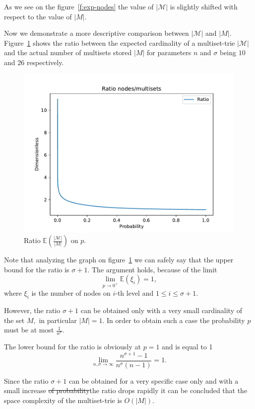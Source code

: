 \documentclass[10pt,letterpaper]{article}
\providecommand{\DIFaddtex}[1]{{\protect\color{blue}\uwave{#1}}} %
\providecommand{\DIFdeltex}[1]{{\protect\color{red}\sout{#1}}}                      %
\providecommand{\DIFaddbegin}{} %
\providecommand{\DIFaddend}{} %
\providecommand{\DIFdelbegin}{} %
\providecommand{\DIFdelend}{} %
\providecommand{\DIFadd}[1]{\texorpdfstring{\DIFaddtex{#1}}{#1}} %
\providecommand{\DIFdel}[1]{\texorpdfstring{\DIFdeltex{#1}}{}} %
\newcommand{\DIFscaledelfig}{0.5}
\newlength{\DIFdelgraphicswidth} %
\newlength{\DIFdelgraphicsheight} %
\newcommand{\DIFaddincludegraphics}[2][]{{\color{blue}\fbox{\DIFOincludegraphics[#1]{#2}}}} %
\newcommand{\DIFdelincludegraphics}[2][]{%
\sbox{\DIFdelgraphicsbox}{\DIFOincludegraphics[#1]{#2}}%
\settoboxwidth{\DIFdelgraphicswidth}{\DIFdelgraphicsbox} %
\settoboxtotalheight{\DIFdelgraphicsheight}{\DIFdelgraphicsbox} %
\scalebox{\DIFscaledelfig}{%
\parbox[b]{\DIFdelgraphicswidth}{\usebox{\DIFdelgraphicsbox}\\[-\baselineskip] \rule{\DIFdelgraphicswidth}{0em}}\llap{\resizebox{\DIFdelgraphicswidth}{\DIFdelgraphicsheight}{%
\setlength{\unitlength}{\DIFdelgraphicswidth}%
\begin{picture}(1,1)%
\thicklines\linethickness{2pt} %
{\color[rgb]{1,0,0}\put(0,0){\framebox(1,1){}}}%
{\color[rgb]{1,0,0}\put(0,0){\line( 1,1){1}}}%
{\color[rgb]{1,0,0}\put(0,1){\line(1,-1){1}}}%
\end{picture}%
}\hspace*{3pt}}} %
} %
\DeclareRobustCommand{\DIFaddbegin}{\DIFOaddbegin \let\includegraphics\DIFaddincludegraphics} %
\DeclareRobustCommand{\DIFaddend}{\DIFOaddend \let\includegraphics\DIFOincludegraphics} %
\DeclareRobustCommand{\DIFdelbegin}{\DIFOdelbegin \let\includegraphics\DIFdelincludegraphics} %
\DeclareRobustCommand{\DIFdelend}{\DIFOaddend \let\includegraphics\DIFOincludegraphics} %
\begin{document}
As we see on the figure~\ref{f:exp-nodes} the value of $|\mathcal{M}|$ is slightly 
shifted with respect to the value of $|M|.$

Now we demonstrate a more descriptive comparison between $|\mathcal{M}|$ and 
$|M|.$ Figure~\ref{f:ratio-exp-msets} shows the ratio between the expected cardinality 
of a multiset-trie $|\mathcal{M}|$ and the actual number of multisets stored $|M|$ for 
parameters $n$ and $\sigma$ being $10$ and $26$ respectively.

\begin{figure}[h!]
\center
\includegraphics[width=.4\textwidth, keepaspectratio]{ratio-exp-nodes-and-msets-on-prob.pdf}
\caption{Ratio $\mathbb{E}(\frac{|\mathcal{M}|}{|M|})$ on $p.$}
\label{f:ratio-exp-msets}
\end{figure}

Note that analyzing the graph on figure~\ref{f:ratio-exp-msets} we can safely 
say that the upper bound for the ratio is $\sigma + 1.$ The argument holds, 
because of the limit 
\begin{equation}
\lim_{p\rightarrow 0^+} \mathbb{E}(\xi_i) = 1,
\end{equation}
where $\xi_i$ is the number of nodes on $i$-th level and $1\leq i \leq \sigma + 1.$ 

However, the ratio $\sigma + 1$ can be obtained only with a very small cardinality 
of the set $M,$ in particular $|M| = 1.$ In order to obtain such a case the 
probability $p$ must be at most $\frac{1}{n^\sigma}.$

The lower bound for the ratio is obviously at $p=1$ and is equal to 1
\begin{equation}
\lim_{n,\sigma \rightarrow\infty} \frac{n^{\sigma + 1} - 1}{n^\sigma (n-1)} = 1.
\end{equation}

Since the ratio $\sigma + 1$ can be obtained for a very specific case only and 
with a small increase \DIFdelbegin \DIFdel{of probability}\DIFdelend \DIFaddbegin \DIFadd{in probability, }\DIFaddend the ratio drops rapidly it can be concluded 
that the space complexity of the multiset-trie is $O(|M|).$
\end{document}
